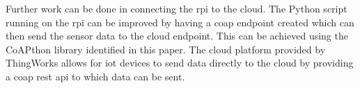 Further work can be done in connecting the \gls{rpi} to the cloud. The Python
script running on the \gls{rpi} can be improved by having a \gls{coap} endpoint
created which can then send the sensor data to the cloud endpoint. This can be
achieved using the CoAPthon library identified in this paper. The cloud platform
provided by ThingWorks allows for \gls{iot} devices to send data directly to the 
cloud by providing a \gls{coap} \gls{rest} \gls{api} to which data can be sent.